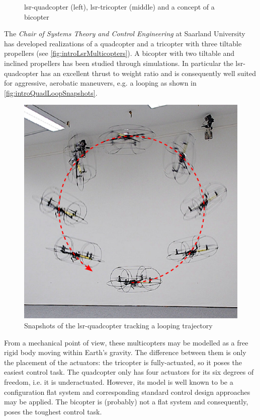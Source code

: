 \begin{figure}[ht]
 \centering
 
 \caption{lsr-quadcopter (left), lsr-tricopter (middle) and a concept of a bicopter}
 \label{fig:introLsrMulticopters}
\end{figure}

The \textit{Chair of Systems Theory and Control Engineering} at Saarland University has developed realizations of a quadcopter and a tricopter with three tiltable propellers (see \autoref{fig:introLsrMulticopters}).
A bicopter with two tiltable and inclined propellers has been studied through simulations.
In particular the lsr-quadcopter has an excellent thrust to weight ratio and is consequently well suited for aggressive, aerobatic maneuvers, e.g. a looping as shown in \autoref{fig:introQuadLoopSnapshots}.

\begin{figure}[ht]
 \centering
 \includegraphics{graphics/QuadLoopSnapshots}
 \caption{Snapshots of the lsr-quadcopter tracking a looping trajectory}
 \label{fig:introQuadLoopSnapshots}
\end{figure}

From a mechanical point of view, these multicopters may be modelled as a free rigid body moving within Earth's gravity.
The difference between them is only the placement of the actuators:
the tricopter is fully-actuated, so it poses the easiest control task.
The quadcopter only has four actuators for its six degrees of freedom, i.e. it is underactuated.
However, its model is well known to be a configuration flat system and corresponding standard control design approaches may be applied.
The bicopter is (probably) not a flat system and consequently, poses the toughest control task.


